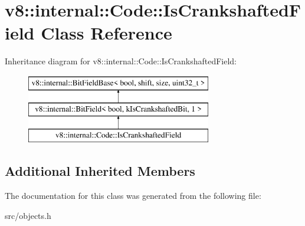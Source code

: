 \hypertarget{classv8_1_1internal_1_1_code_1_1_is_crankshafted_field}{}\section{v8\+:\+:internal\+:\+:Code\+:\+:Is\+Crankshafted\+Field Class Reference}
\label{classv8_1_1internal_1_1_code_1_1_is_crankshafted_field}
Inheritance diagram for v8\+:\+:internal\+:\+:Code\+:\+:Is\+Crankshafted\+Field\+:\begin{figure}[H]
\begin{center}
\leavevmode
\includegraphics[height=3.000000cm]{classv8_1_1internal_1_1_code_1_1_is_crankshafted_field}
\end{center}
\end{figure}
\subsection*{Additional Inherited Members}


The documentation for this class was generated from the following file\+:\begin{DoxyCompactItemize}
\item 
src/objects.\+h\end{DoxyCompactItemize}
